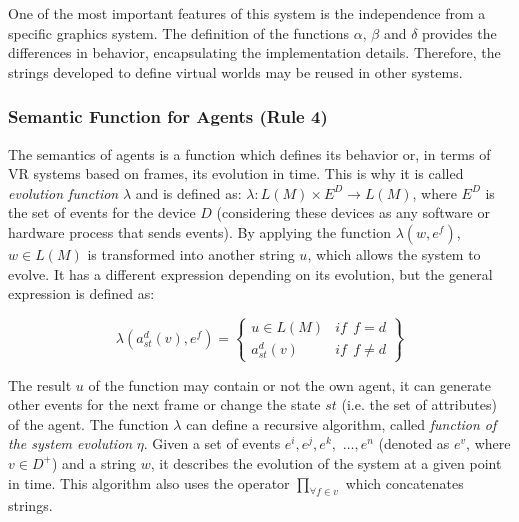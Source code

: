 \documentclass{aamas2012}
\begin{document}
One of the most important features of this system is the independence from a specific graphics
system. The definition of the functions $\alpha$, $\beta$ and $\delta$ provides the differences in
behavior, encapsulating the implementation details. Therefore, the strings developed to define
virtual worlds may be reused in other systems.


\subsubsection{Semantic Function for Agents (Rule 4)
\label{sec:rule4}}

The semantics of agents is a function which defines its behavior or, in terms of VR systems based on frames, its evolution in time. This is why it is called
\textit{evolution function} $\lambda$ and is defined as:
$\lambda: L(M) \times E^D \rightarrow L(M)$, where $E^D$ is the set of events
for the device $D$ (considering these devices as
any software or hardware process that sends events). By applying the function
$\lambda(w, e^{f})$, $w \in L(M)$ is transformed into another string $u$,
which allows the system to evolve. It has a different expression depending on
its evolution, but the general expression is defined as:

\begin{small}
\begin{equation}
    \lambda (a_{st}^{d}(v),e^{f})=
    \left\{
    \begin{array}{ll}
        u \in L(M) & \mathit{if}  \ \ f = d \\
        a_{st}^{d}(v)  & \mathit{if}  \ \ f \neq d
    \end{array}\right\}
\end{equation}
\end{small}

The result $u$ of the function may contain or not the own agent, it can generate other
events for the next frame or change the state $st$ (i.e. the set of attributes) of the agent.
The function $\lambda$ can define a recursive algorithm, called
\textit{function of the system evolution} $\eta$. Given a set of
events $e^i, e^j, e^k,$ $\dots, e^n$ (denoted as $e^v$, where $v \in D^+$)
and a string $w$, it describes the evolution of the system at a given point
in time. This algorithm also uses the operator $\prod_{\forall f \in v}$ which concatenates
strings.
\end{document}
